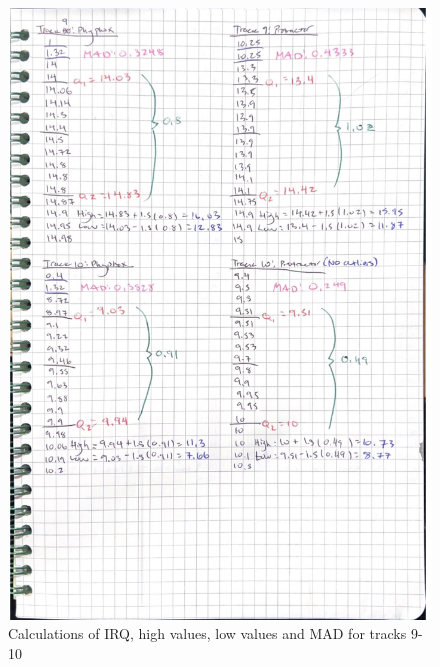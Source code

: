 \documentclass[idxtotoc,hyperref,openany]{labbook} %
\begin{document}
\begin{figure}[H] %
\begin{center}
\includegraphics[width=0.9\linewidth]{images/PhyProTrack9-10.png}
\end{center}
\caption{Calculations of IRQ, high values, low values and MAD for tracks 9-10}
\label{fig:Track9-10PhyphoxProtractor}
\end{figure}
\end{document}
